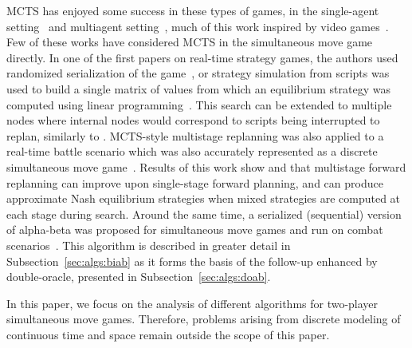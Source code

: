 MCTS has enjoyed some success in these types of games, in the single-agent 
setting~\cite{Pepels14Monte,Perez14PTSP} and multiagent setting~\cite{Balla09UCT}, much of this work inspired by video 
games~\cite{Cowling13Video,BellemareNVB13,Ontanon13RTSSurvey}. Few of these works have considered MCTS
in the simultaneous move game directly. 
In one of the first papers on real-time strategy games, the authors used randomized serialization 
of the game~\cite{kovarsky2005heuristic}, or strategy simulation
from scripts was used to build a single matrix of values from which an equilibrium strategy was 
computed using linear programming~\cite{Sailor07adversarial}.  
This search can be extended to multiple nodes where internal nodes would correspond to scripts being interrupted to replan, similarly to \cite{lisy2009gbgts}.
MCTS-style multistage replanning was also applied to a real-time battle scenario which was also accurately
represented as a discrete simultaneous move game~\cite{Beard12Using}. Results of this work show and that multistage
forward replanning can improve upon single-stage forward planning, and can produce approximate Nash equilibrium strategies
when mixed strategies are computed at each stage during search.
Around the same time, a serialized (sequential) version of alpha-beta was proposed for simultaneous move games 
and run on combat scenarios~\cite{Churchill2012Fast}. This algorithm is described in greater detail in
Subsection~\ref{sec:algs:biab} as it forms the basis of the follow-up enhanced by
double-oracle, presented in Subsection~\ref{sec:algs:doab}.

In this paper, we focus on the analysis of different algorithms for two-player simultaneous move games. Therefore, 
problems arising from discrete modeling of continuous time and space remain outside the scope of this paper.






